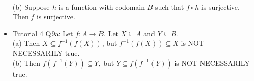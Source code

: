 \documentclass{article}
\begin{document}
\begin{itemize}
        \\ \hspace*{3mm} (b) Suppose $h$ is a function with codomain $B$ such that $f \circ h$ is surjective. Then $f$ is surjective.
    \item Tutorial 4 Q9a: Let $f:A \xrightarrow{} B$. Let $X \subseteq A$ and $Y \subseteq B$. 
        \\ \hspace*{3mm} (a) Then $X \subseteq f^{-1}(f(X))$, but $f^{-1}(f(X)) \subseteq X$ is NOT NECESSARILY true.
        \\ \hspace*{3mm} (b) Then $f(f^{-1}(Y)) \subseteq Y$, but $Y \subseteq f(f^{-1}(Y))$ is NOT NECESSARILY true.
\end{itemize}

\end{document}
